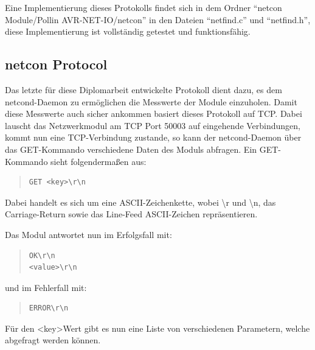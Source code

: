 \documentclass[a4paper,14pt,headsepline]{scrartcl}
\begin{document}
Eine Implementierung dieses Protokolls findet sich in dem Ordner "`netcon Module/Pollin AVR-NET-IO/netcon"' in den Dateien "`netfind.c"' und "`netfind.h"', diese Implementierung ist vollständig getestet und funktionsfähig.

\newpage

\subsection{netcon Protocol}
Das letzte für diese Diplomarbeit entwickelte Protokoll dient dazu, es dem netcond-Daemon zu ermöglichen die Messwerte der Module einzuholen. Damit diese Messwerte auch sicher ankommen basiert dieses Protokoll auf TCP. Dabei lauscht das Netzwerkmodul am TCP Port 50003 auf eingehende Verbindungen, kommt nun eine TCP-Verbindung zustande, so kann der netcond-Daemon über das GET-Kommando verschiedene Daten des Moduls abfragen. Ein GET-Kommando sieht folgendermaßen aus:

\begin{quote}
\begin{verbatim}
GET <key>\r\n
\end{verbatim}
\end{quote}

Dabei handelt es sich um eine ASCII-Zeichenkette, wobei \textbackslash r und \textbackslash n, das Carriage-Return sowie das Line-Feed ASCII-Zeichen repräsentieren.

Das Modul antwortet nun im Erfolgsfall mit:
\begin{quote}
\begin{verbatim}
OK\r\n
<value>\r\n
\end{verbatim}
\end{quote}
und im Fehlerfall mit:
\begin{quote}
\begin{verbatim}
ERROR\r\n
\end{verbatim}
\end{quote}

Für den \textless key\textgreater Wert gibt es nun eine Liste von verschiedenen Parametern, welche abgefragt werden können.
\end{document}
